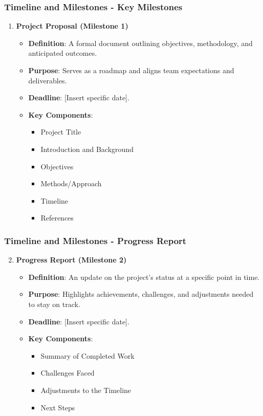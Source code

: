 \documentclass{beamer}
\begin{document}
\begin{frame}[fragile]
    \frametitle{Timeline and Milestones - Key Milestones}
    \begin{enumerate}
        \item \textbf{Project Proposal (Milestone 1)}
        \begin{itemize}
            \item \textbf{Definition}: A formal document outlining objectives, methodology, and anticipated outcomes.
            \item \textbf{Purpose}: Serves as a roadmap and aligns team expectations and deliverables.
            \item \textbf{Deadline}: [Insert specific date].
            \item \textbf{Key Components}:
            \begin{itemize}
                \item Project Title
                \item Introduction and Background
                \item Objectives
                \item Methods/Approach
                \item Timeline
                \item References
            \end{itemize}
        \end{itemize}
    \end{enumerate}
\end{frame}

\begin{frame}[fragile]
    \frametitle{Timeline and Milestones - Progress Report}
    \begin{enumerate}
        \setcounter{enumi}{1}
        \item \textbf{Progress Report (Milestone 2)}
        \begin{itemize}
            \item \textbf{Definition}: An update on the project's status at a specific point in time.
            \item \textbf{Purpose}: Highlights achievements, challenges, and adjustments needed to stay on track.
            \item \textbf{Deadline}: [Insert specific date].
            \item \textbf{Key Components}:
            \begin{itemize}
                \item Summary of Completed Work
                \item Challenges Faced
                \item Adjustments to the Timeline
                \item Next Steps
            \end{itemize}
        \end{itemize}
    \end{enumerate}
\end{frame}
\end{document}
